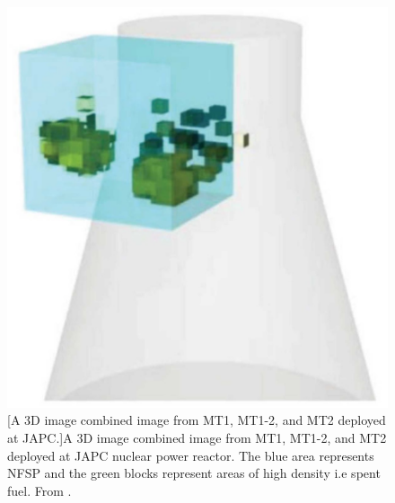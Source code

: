 \begin{figure}[!h]
\begin{minipage}{.45\textwidth}
  \includegraphics[width=\linewidth]{Chapter5/Figs/MuTomographyExamples/3dImagingNFSP.jpg}
  [A 3D image combined image from MT1, MT1-2, and MT2 deployed at JAPC.]{A 3D image combined image from MT1, MT1-2, and MT2 deployed at JAPC nuclear power reactor. The blue area represents NFSP and the green blocks represent areas of high density i.e spent fuel. From \cite{Fujii_ReactorRadiography_2019}.}
  \label{fig:3dImagingNFSP}
\end{minipage}
\end{figure}



